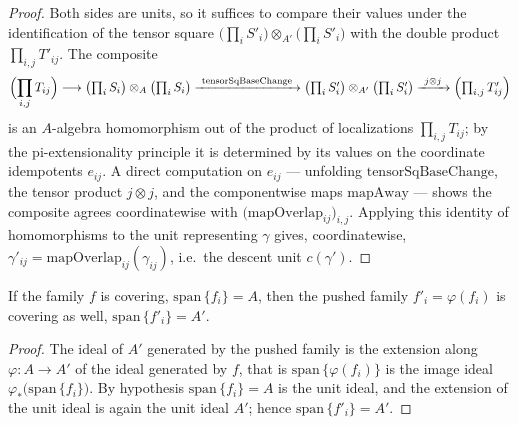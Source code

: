 \begin{proof}
  \leanok
  Both sides are units, so it suffices to compare their values under the identification of the
  tensor square \(\bigl(\prod_i S'_i\bigr) \otimes_{A'} \bigl(\prod_i S'_i\bigr)\) with the
  double product \(\prod_{i,j} T'_{ij}\).  The composite
  \[
    \Bigl(\prod_{i,j} T_{ij}\Bigr) \longrightarrow \bigl(\textstyle\prod_i S_i\bigr) \otimes_A
    \bigl(\prod_i S_i\bigr) \xrightarrow{\ \mathrm{tensorSqBaseChange}\ } \bigl(\textstyle\prod_i
    S'_i\bigr) \otimes_{A'} \bigl(\prod_i S'_i\bigr) \xrightarrow{\ j \otimes j\ }
    \Bigl(\prod_{i,j} T'_{ij}\Bigr)
  \]
  is an \(A\)-algebra homomorphism out of the product of localizations \(\prod_{i,j} T_{ij}\);
  by the pi-extensionality principle it is determined by its values on the coordinate
  idempotents \(e_{ij}\).  A direct computation on \(e_{ij}\) — unfolding
  \(\mathrm{tensorSqBaseChange}\), the tensor product \(j \otimes j\), and the componentwise
  maps \(\mathrm{mapAway}\) — shows the composite agrees coordinatewise with
  \(\bigl(\mathrm{mapOverlap}_{ij}\bigr)_{i,j}\).  Applying this identity of homomorphisms to the
  unit representing \(\gamma\) gives, coordinatewise, \(\gamma'_{ij} =
  \mathrm{mapOverlap}_{ij}(\gamma_{ij})\), i.e.\ the descent unit \(c(\gamma')\).
\end{proof}

\begin{lemma}
  \label{lem:awayCover_span_range_baseChange}
  \leanok
  If the family \(f\) is covering, \(\mathrm{span}\,\{f_i\} = A\), then the pushed family
  \(f'_i = \varphi(f_i)\) is covering as well, \(\mathrm{span}\,\{f'_i\} = A'\).
\end{lemma}
\begin{proof}
  \leanok
  The ideal of \(A'\) generated by the pushed family is the extension along \(\varphi \colon A
  \to A'\) of the ideal generated by \(f\), that is \(\mathrm{span}\,\{\varphi(f_i)\}\) is the
  image ideal \(\varphi_{*}\bigl(\mathrm{span}\,\{f_i\}\bigr)\).  By hypothesis
  \(\mathrm{span}\,\{f_i\} = A\) is the unit ideal, and the extension of the unit ideal is again
  the unit ideal \(A'\); hence \(\mathrm{span}\,\{f'_i\} = A'\).
\end{proof}

